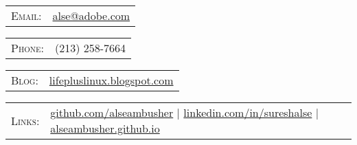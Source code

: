 \begin{tabular}{rl}
\textsc{Email:} & \href{mailto:alse@adobe.com}{alse@adobe.com}\\
\end{tabular}
\hfill
\begin{tabular}{rl}
\textsc{\hspace{1.7cm}Phone:} & (213) 258-7664\\
\end{tabular}
\hfill
\begin{tabular}{rl}
\textsc{Blog:} & \href{lifepluslinux.blogspot.com}{lifepluslinux.blogspot.com}\\
\end{tabular}
%
\begin{tabular}{rl}
\textsc{Links:} & \href{http://github.com/alseambusher}{github.com/alseambusher} \hspace{.5cm}|\hspace{.5cm} \href{http://linkedin.com/in/sureshalse}{linkedin.com/in/sureshalse} \hspace{.5cm}|\hspace{.3cm} \href{alseambusher.github.io}{alseambusher.github.io}
\end{tabular}
\vspace{5pt}
